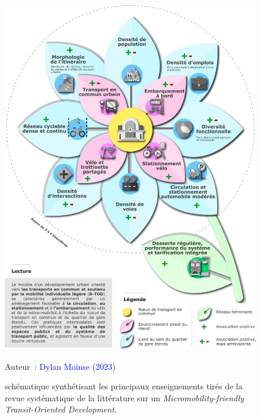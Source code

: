 \begin{refsegment}
    \begin{figure}[h!]\vspace*{4pt}
        \caption{ schématique synthétisant les principaux enseignements tirés de la revue systématique de la littérature sur un \textsl{Micromobility-friendly Transit-Oriented Development}.}
        \label{fig-chap2:synthese-resultats-btod-rsl}
        \centerline{\includegraphics[width=1\columnwidth]{src/Figures/Chap-2/FR_RSL_Fleur_TOD.pdf}}
        \vspace{5pt}
        \begin{flushright}\scriptsize{
        Auteur~: \textcolor{blue}{Dylan Moinse (2023)}
        }\end{flushright}
    \end{figure}
    

\end{refsegment}
